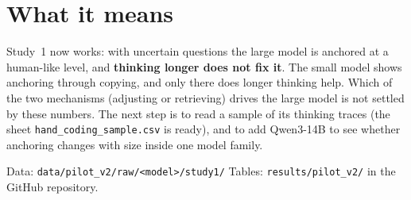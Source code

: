 \documentclass[11pt,a4paper]{article}
\begin{document}
\section*{What it means}
Study~1 now works: with uncertain questions the large model is anchored at a human-like level, and \textbf{thinking longer does not fix it}. The small model shows anchoring through copying, and only there does longer thinking help. Which of the two mechanisms (adjusting or retrieving) drives the large model is not settled by these numbers. The next step is to read a sample of its thinking traces (the sheet \texttt{hand\_coding\_sample.csv} is ready), and to add Qwen3-14B to see whether anchoring changes with size inside one model family.

\vfill
{\small Data: \texttt{data/pilot\_v2/raw/<model>/study1/} \textperiodcentered{} Tables: \texttt{results/pilot\_v2/} in the GitHub repository.}
\end{document}
